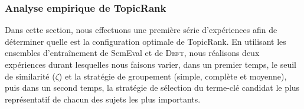       \subsubsection{Analyse empirique de TopicRank}
      \label{subsubsec:main-automatic_keyphrase_annotation-unsupervised_automatic_keyphrase_extraction-evaluation-empirical_analysis_of_topicrank}
        Dans cette section, nous effectuons une première série d'expériences
        afin de déterminer quelle est la configuration optimale de TopicRank. En
        utilisant les ensembles d'entraînement de SemEval et de \textsc{Deft},
        nous réalisons deux expériences durant lesquelles nous faisons varier,
        dans un premier temps, le seuil de similarité ($\zeta$) et la stratégie
        de groupement (simple, complète et moyenne), puis dans un second temps,
        la stratégie de sélection du terme-clé candidat le plus représentatif de
        chacun des sujets les plus importants.
